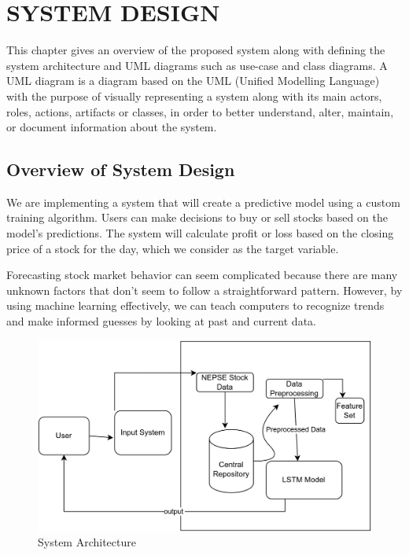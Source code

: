 \documentclass[./main.tex]{subfiles}
\begin{document}
\chapter{ SYSTEM DESIGN}
\noindent
This chapter gives an overview of the proposed system along with defining
the system architecture and UML diagrams such as use-case and class diagrams. A
UML diagram is a diagram based on the UML (Unified Modelling Language) with
the purpose of visually representing a system along with its main actors, roles,
actions, artifacts or classes, in order to better understand, alter, maintain, or document
information about the system.


\section{Overview of System Design}
\noindent
We are implementing a system that will create a predictive model using a custom training algorithm. Users can make decisions to buy or sell stocks based on the model's predictions. The system will calculate profit or loss based on the closing price of a stock for the day, which we consider as the target variable.

\noindent
Forecasting stock market behavior can seem complicated because there are many unknown factors that don't seem to follow a straightforward pattern. However, by using machine learning effectively, we can teach computers to recognize trends and make informed guesses by looking at past and current data.
\begin{figure}[H]
  \centering
  \includegraphics[width=0.50\linewidth ]{images/Architecture.png}
  \caption{System Architecture}
  \label{fig:4.1}
\end{figure}
\end{document}
